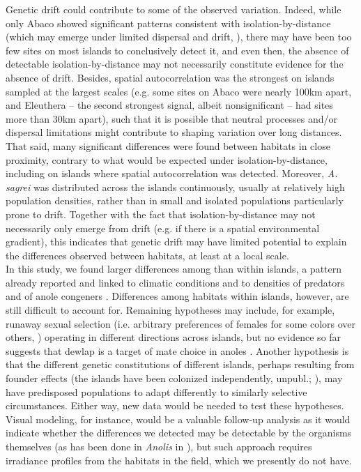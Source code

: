 Genetic drift could contribute to some of the observed variation. Indeed, while only Abaco showed significant patterns consistent with isolation-by-distance (which may emerge under limited dispersal and drift, \citealt{Wright1943, Kimura1964, Slatkin1987}), there may have been too few sites on most islands to conclusively detect it, and even then, the absence of detectable isolation-by-distance may not necessarily constitute evidence for the absence of drift. Besides, spatial autocorrelation was the strongest on islands sampled at the largest scales (e.g. some sites on Abaco were nearly 100km apart, and Eleuthera -- the second strongest signal, albeit nonsignificant -- had sites more than 30km apart), such that it is possible that neutral processes and/or dispersal limitations might contribute to shaping variation over long distances. That said, many significant differences were found between habitats in close proximity, contrary to what would be expected under isolation-by-distance, including on islands where spatial autocorrelation was detected. Moreover, \textit{A. sagrei} was distributed across the islands continuously, usually at relatively high population densities, rather than in small and isolated populations particularly prone to drift. Together with the fact that isolation-by-distance may not necessarily only emerge from drift (e.g. if there is a spatial environmental gradient), this indicates that genetic drift may have limited potential to explain the differences observed between habitats, at least at a local scale.\\

In this study, we found larger differences among than within islands, a pattern already reported and linked to climatic conditions \citep{Driessens2017} and to densities of predators and of anole congeners \citep{Vanhooydonck2009, Baeckens2018}. Differences among habitats within islands, however, are still difficult to account for. Remaining hypotheses may include, for example, runaway sexual selection (i.e. arbitrary preferences of females for some colors over others, \citealt{Andersson1994}) operating in different directions across islands, but no evidence so far suggests that dewlap is a target of mate choice in anoles \citep{Tokarz2002, Tokarz2005, Lailvaux2006, Nicholson2007}. Another hypothesis is that the different genetic constitutions of different islands, perhaps resulting from founder effects (the islands have been colonized independently, \citealt{vandeSchoot2016} unpubl.; \citealt{Driessens2017, Reynolds2020}), may have predisposed populations to adapt differently to similarly selective circumstances. Either way, new data would be needed to test these hypotheses. Visual modeling, for instance, would be a valuable follow-up analysis as it would indicate whether the differences we detected may be detectable by the organisms themselves (as has been done in \textit{Anolis} in \citealt{Leal2004, Fleishman2020}), but such approach requires irradiance profiles from the habitats in the field, which we presently do not have.\\

